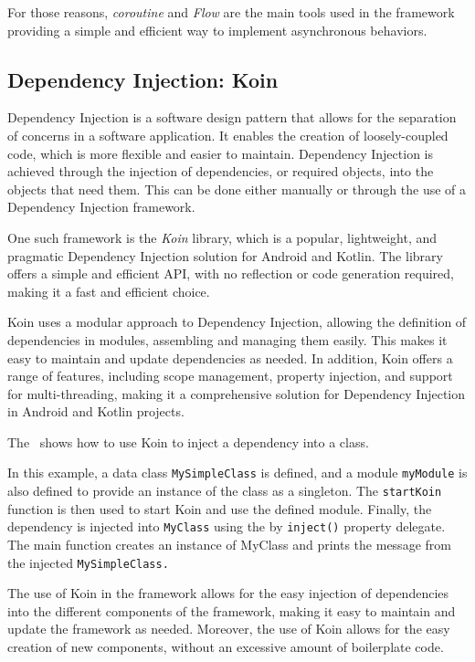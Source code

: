For those reasons, \emph{coroutine} and \emph{Flow} are the main tools used in the framework providing a simple and efficient way to implement
asynchronous behaviors.

\subsection{Dependency Injection: Koin}

Dependency Injection is a software design pattern that allows for the separation of concerns in a software application. It enables the creation of
loosely-coupled code, which is more flexible and easier to maintain. Dependency Injection is achieved through the injection of dependencies, or
required objects, into the objects that need them. This can be done either manually or through the use of a Dependency Injection framework.

One such framework is the \emph{Koin} library, which is a popular, lightweight, and pragmatic Dependency Injection solution for Android and Kotlin.
The library offers a simple and efficient API, with no reflection or code generation required, making it a fast and efficient choice.

Koin uses a modular approach to Dependency Injection, allowing the definition of dependencies in modules, assembling and managing
them easily. This makes it easy to maintain and update dependencies as needed. In addition, Koin offers a range of features, including scope
management, property injection, and support for multi-threading, making it a comprehensive solution for Dependency Injection in Android and Kotlin
projects.

The~ shows how to use Koin to inject a dependency into a class.



In this example, a data class \texttt{MySimpleClass} is defined, and a module \texttt{myModule} is also defined to provide an instance of the class
as a singleton. The \texttt{startKoin} function is then used to start Koin and use the defined module. Finally, the dependency is injected into
\texttt{MyClass} using the by \texttt{inject()} property delegate. The main function creates an instance of MyClass and prints the message from the
injected \texttt{MySimpleClass.}

The use of Koin in the framework allows for the easy injection of dependencies into the different components of the framework, making it easy to
maintain and update the framework as needed. Moreover, the use of Koin allows for the easy creation of new components, without an excessive amount of
boilerplate code.

